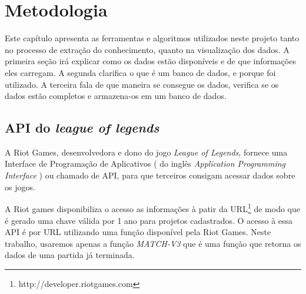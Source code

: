 \chapter{Metodologia}
Este capítulo apresenta as ferramentas e algoritmos utilizados neste projeto tanto no processo de extração do conhecimento, quanto na visualização dos dados.
A primeira seção irá explicar como os dados estão disponíveis e de que informações eles carregam. A segunda clarifica o que é um banco de dados, e porque foi utilizado.  A terceira fala de que maneira se consegue os dados, verifica se os dados estão completos e armazena-os em um banco de dados.

\section{API do \textit{league of legends}}

A Riot Games, desenvolvedora e dono do jogo \textit{League of Legends}, fornece uma Interface de Programação de Aplicativos ( do inglês \textit{Application Programming Interface} ) ou chamado de API, para que terceiros consigam acessar dados sobre os jogos.

A Riot games disponibiliza o acesso as informações à patir da URL\footnote{http://developer.riotgames.com} de modo que é gerado uma chave válida por 1 ano para projetos cadastrados.
O acesso à essa API é por URL utilizando uma função disponível pela Riot Games. Neste trabalho, usaremos apenas a função \textit{MATCH-V3} que é uma função que retorna os dados de uma partida já terminada.

